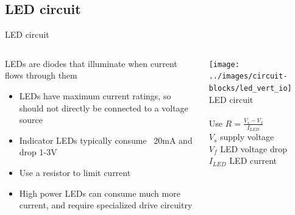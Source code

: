 \documentclass{beamer}
\begin{document}
\subsection{LED circuit}
\begin{frame}{LED circuit}
  \begin{columns}[T]
    \begin{column}{.6\textwidth}
	  LEDs are diodes that illuminate when current flows through them
      \begin{itemize}
        \item LEDs have maximum current ratings, so should not directly be connected to a voltage source
        \item Indicator LEDs typically consume ~20mA and drop 1-3V
        \item Use a resistor to limit current
        \item High power LEDs can consume much more current, and require specialized drive circuitry
      \end{itemize}
    \end{column}

    \begin{column}{0.4\textwidth} \centering
      \texttt{[image: ../images/circuit-blocks/led\_vert\_io]} \\
      LED circuit \\
      ~ \\
      Use $R=\frac{V_s-V_f}{I_{LED}}$ \\
      {\tiny
        $V_s$ supply voltage \\
        $V_f$ LED voltage drop \\
        $I_{LED}$ LED current \\
      }
    \end{column}
  \end{columns}
\end{frame}
\end{document}
